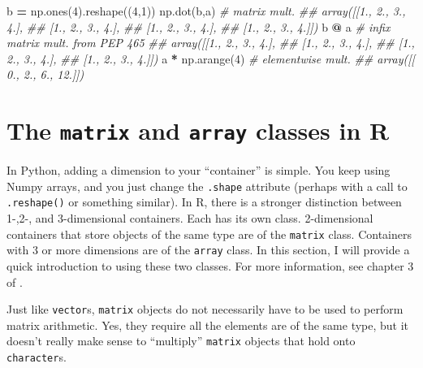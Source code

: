 \documentclass[
  12pt,
  krantz2]{krantz}
\makeatletter
\newenvironment{Shaded}{\begin{snugshade}}{\end{snugshade}}
\newcommand{\CommentTok}[1]{\textcolor[rgb]{0.37,0.37,0.37}{\textit{#1}}}
\newcommand{\DecValTok}[1]{\textcolor[rgb]{0.06,0.06,0.06}{#1}}
\newcommand{\NormalTok}[1]{#1}
\newcommand{\OperatorTok}[1]{\textcolor[rgb]{0.43,0.43,0.43}{\textbf{#1}}}
\newenvironment{kframe}{%
\medskip{}
\setlength{\fboxsep}{.8em}
 \def\at@end@of@kframe{}%
 \ifinner\ifhmode%
  \def\at@end@of@kframe{\end{minipage}}%
  \begin{minipage}{\columnwidth}%
 \fi\fi%
 \def\FrameCommand##1{\hskip\@totalleftmargin \hskip-\fboxsep
 \colorbox{shadecolor}{##1}\hskip-\fboxsep
     \hskip-\linewidth \hskip-\@totalleftmargin \hskip\columnwidth}%
 \MakeFramed {\advance\hsize-\width
   \@totalleftmargin\z@ \linewidth\hsize
   \@setminipage}}%
 {\par\unskip\endMakeFramed%
 \at@end@of@kframe}
\renewenvironment{Shaded}{\begin{kframe}}{\end{kframe}}
\newenvironment{rmd-caution}{\begin{lrbox}{\rmdbox}
  \minipage[c]{\dimexpr \textwidth-2\fboxrule-\wd\excl-\columnsep}
    \vspace*{\columnsep}}%
{\vspace*{\columnsep}\endminipage\end{lrbox}%
  {\par\color{yellow}\fboxsep=0pt
    \fbox{\usebox\excl\usebox\rmdbox\hspace{\columnsep}}\par}}
\makeatother
\begin{document}
\begin{Shaded}
\begin{Highlighting}[]
\NormalTok{b }\OperatorTok{=}\NormalTok{ np.ones(}\DecValTok{4}\NormalTok{).reshape((}\DecValTok{4}\NormalTok{,}\DecValTok{1}\NormalTok{)) }
\NormalTok{np.dot(b,a) }\CommentTok{\# matrix mult.}
\CommentTok{\#\# array([[1., 2., 3., 4.],}
\CommentTok{\#\#        [1., 2., 3., 4.],}
\CommentTok{\#\#        [1., 2., 3., 4.],}
\CommentTok{\#\#        [1., 2., 3., 4.]])}
\NormalTok{b }\OperatorTok{@}\NormalTok{ a }\CommentTok{\# infix matrix mult. from PEP 465}
\CommentTok{\#\# array([[1., 2., 3., 4.],}
\CommentTok{\#\#        [1., 2., 3., 4.],}
\CommentTok{\#\#        [1., 2., 3., 4.],}
\CommentTok{\#\#        [1., 2., 3., 4.]])}
\NormalTok{a }\OperatorTok{*}\NormalTok{ np.arange(}\DecValTok{4}\NormalTok{) }\CommentTok{\# elementwise mult.}
\CommentTok{\#\# array([[ 0.,  2.,  6., 12.]])}
\end{Highlighting}
\end{Shaded}

\hypertarget{the-matrix-and-array-classes-in-r}{%
\section{\texorpdfstring{The \texttt{matrix} and \texttt{array} classes in R}{The matrix and array classes in R}}\label{the-matrix-and-array-classes-in-r}}

In Python, adding a dimension to your ``container'' is simple. You keep using Numpy arrays, and you just change the \texttt{.shape} attribute (perhaps with a call to \texttt{.reshape()} or something similar). In R, there is a stronger distinction between 1-,2-, and 3-dimensional containers. Each has its own class. 2-dimensional containers that store objects of the same type are of the \texttt{matrix} class. Containers with 3 or more dimensions are of the \texttt{array} class. In this section, I will provide a quick introduction to using these two classes. For more information, see chapter 3 of \citep{matloff_r_book}.

\begin{rmd-caution}
Just like \texttt{vector}s, \texttt{matrix} objects do not necessarily have to be used to perform matrix arithmetic. Yes, they require all the elements are of the same type, but it doesn't really make sense to ``multiply'' \texttt{matrix} objects that hold onto \texttt{character}s.

\end{rmd-caution}
\end{document}
